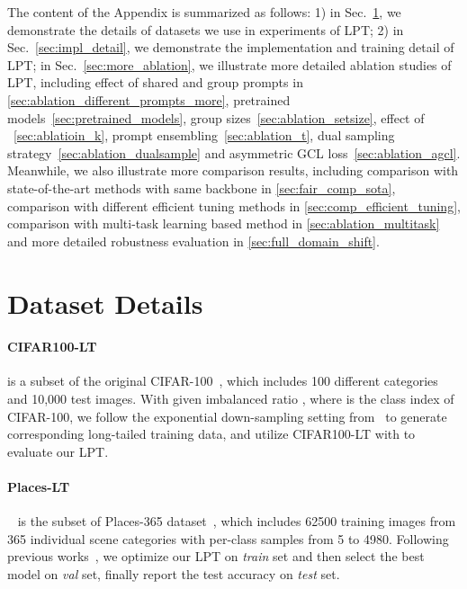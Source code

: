 \documentclass{article} \usepackage{iclr2023_conference,times}
\begin{document}



\clearpage
\appendix
The content of the Appendix is summarized as follows: 1) in Sec.~\ref{app:datasets}, we demonstrate the details of datasets we use in experiments of LPT; 2) in Sec.~\ref{sec:impl_detail}, we demonstrate the implementation and training detail of LPT; in Sec.~\ref{sec:more_ablation}, we illustrate more detailed ablation studies of LPT, including effect of shared and group prompts in \ref{sec:ablation_different_prompts_more}, pretrained models~\ref{sec:pretrained_models}, group sizes~\ref{sec:ablation_setsize}, effect of ~\ref{sec:ablatioin_k}, prompt ensembling~\ref{sec:ablation_t}, dual sampling strategy~\ref{sec:ablation_dualsample} and asymmetric GCL loss~\ref{sec:ablation_agcl}. Meanwhile, we also illustrate more comparison results, including comparison with state-of-the-art methods with same backbone in \ref{sec:fair_comp_sota}, comparison with different efficient tuning methods in \ref{sec:comp_efficient_tuning}, comparison with multi-task learning based method in \ref{sec:ablation_multitask} and more detailed robustness evaluation in \ref{sec:full_domain_shift}.
\section{Dataset Details}\label{app:datasets}
\paragraph{CIFAR100-LT} is a subset of the original CIFAR-100~\citep{Krizhevsky2009LearningML}, which includes 100 different categories and 10,000 test images. With given imbalanced ratio , where  is the class index of CIFAR-100, we follow the exponential down-sampling setting from~\citep{cao2019learning,cui2019cbloss} to generate corresponding long-tailed training data, and utilize CIFAR100-LT with  to evaluate our LPT.

\paragraph{Places-LT}~\citep{openlongtailrecognition} is the subset of Places-365 dataset~\cite{zhou2017places}, which includes 62500 training images from 365 individual scene categories with per-class samples from 5 to 4980. Following previous works~\citep{openlongtailrecognition,Kang2020Decoupling}, we optimize our LPT on \textit{train} set and then select the best model on \textit{val} set, finally report the test accuracy on \textit{test} set. 
\end{document}
